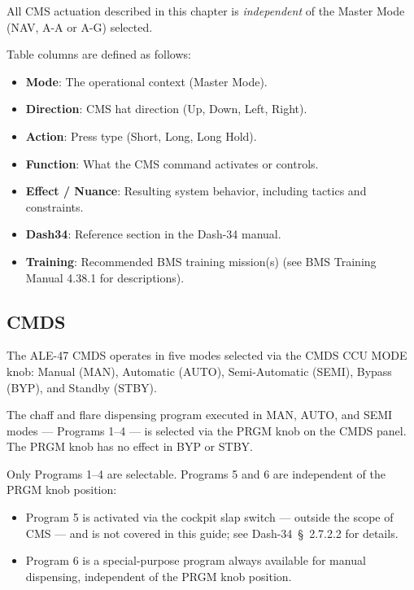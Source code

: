 \documentclass[11pt, a4paper, twoside]{report}
\newcommand{\dashref}[1]{Dash-34~\S~#1}
\newcommand{\trnman}{BMS Training Manual 4.38.1}
\begin{document}
All CMS actuation described in this chapter is \textit{independent} of the Master Mode (NAV, A-A or A-G) selected.

Table columns are defined as follows:

\begin{itemize}
  \item \textbf{Mode}: The operational context (Master Mode).
  \item \textbf{Direction}: CMS hat direction (Up, Down, Left, Right).
  \item \textbf{Action}: Press type (Short, Long, Long Hold).
  \item \textbf{Function}: What the CMS command activates or controls.
  \item \textbf{Effect / Nuance}: Resulting system behavior, including tactics and constraints.
  \item \textbf{Dash34}: Reference section in the Dash-34 manual.
  \item \textbf{Training}: Recommended BMS training mission(s) (see \trnman{} for descriptions).
\end{itemize}

\subsection{CMDS}
\label{sec:C5-S2-S1}

The ALE-47 CMDS operates in five modes selected via the CMDS CCU MODE knob: Manual (MAN), Automatic (AUTO), Semi-Automatic (SEMI), Bypass (BYP), and Standby (STBY).

The chaff and flare dispensing program executed in MAN, AUTO, and SEMI modes --- Programs 1--4 --- is selected via the PRGM knob on the CMDS panel. The PRGM knob has no effect in BYP or STBY.

Only Programs 1--4 are selectable. Programs 5 and 6 are independent of the PRGM knob position:

\begin{itemize}
  \item Program 5 is activated via the cockpit slap switch --- outside the scope of CMS --- and is not covered in this guide; see \dashref{2.7.2.2} for details.
  \item Program 6 is a special-purpose program always available for manual dispensing, independent of the PRGM knob position.
\end{itemize}
\end{document}
